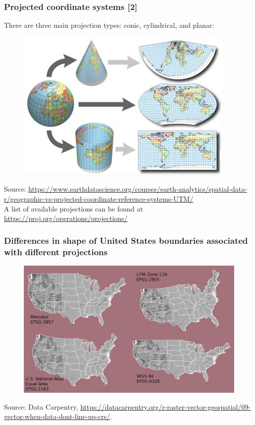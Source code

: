 \documentclass[11pt]{beamer}
\begin{document}
\begin{frame}
\frametitle{Projected coordinate systems [2]}
There are three main projection types: conic, cylindrical, and planar:
\begin{figure}
\includegraphics[scale=0.95]{Proj_CRS.jpg}
\end{figure}
\tiny{Source: \url{https://www.earthdatascience.org/courses/earth-analytics/spatial-data-r/geographic-vs-projected-coordinate-reference-systems-UTM/}}\\
\vspace{5pt}
\scriptsize A list of available projections can be found at \url{https://proj.org/operations/projections/}
\end{frame}

\begin{frame}
\frametitle{Differences in shape of United States boundaries associated with different projections}
\begin{figure}
\includegraphics[scale=0.50]{US_CRS.jpg}
\end{figure}
\tiny{Source: Data Carpentry, \url{https://datacarpentry.org/r-raster-vector-geospatial/09-vector-when-data-dont-line-up-crs/}}.
\end{frame}
\end{document}
